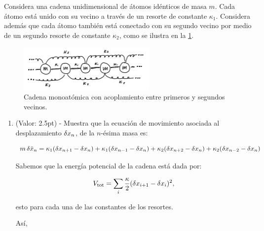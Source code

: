 \documentclass[./../main.tex]{subfiles}
\begin{document}
    \begin{exercise}
        Considera una cadena unidimensional de átomos idénticos de masa \(m\). Cada átomo está unido con su vecino a través de un resorte de constante \(\kappa_{1}\). Considera además que cada átomo también está conectado con su segundo vecino por medio de un segundo resorte de constante \(\kappa_{2}\), como se ilustra en la \cref{fig:monatomicChain}.

        \begin{figure}[htb]
            \centering
            \includegraphics[width=0.6\textwidth]{monatomic-chain}
            \caption{Cadena monoatómica con acoplamiento entre primeros y segundos vecinos.}
            \label{fig:monatomicChain}
        \end{figure}

        \begin{enumerate}
            \item (Valor: 2.5pt) - Muestra que la ecuación de movimiento asociada al desplazamiento \(\fdif{x_{n}}\), de la \(n\)-ésima masa es:
            
            \begin{equation*}
                m\fdif{\ddot{x}_{n}} = \kappa_{1}(\fdif{x_{n + 1}} - \fdif{x_{n}}) + \kappa_{1}(\fdif{x_{n - 1}} - \fdif{x_{n}}) + \kappa_{2}(\fdif{x_{n + 2}} - \fdif{x_{n}}) + \kappa_{2}(\fdif{x_{n - 2}} - \fdif{x_{n}})
            \end{equation*}

            \begin{solution}
                Sabemos que la energía potencial de la cadena está dada por:

                \begin{equation*}
                    V_{\text{tot}} = \sum_{i}\dfrac{\kappa}{2}(\fdif{x_{i + 1}} - \fdif{x_{i}})^{2},
                \end{equation*}

                esto para cada una de las constantes de los resortes.

                Así,


\end{solution}
\end{enumerate}
\end{exercise}
\end{document}
